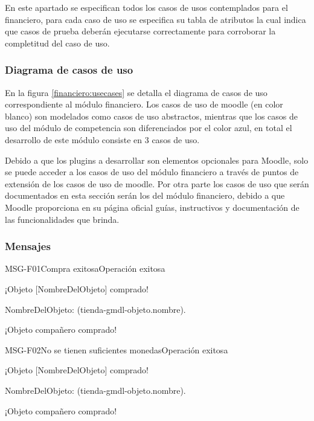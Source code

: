  En este apartado se especifican todos los casos de usos contemplados para el financiero,
 para cada caso de uso se especifica su tabla de atributos la cual indica que casos
 de prueba deberán ejecutarse correctamente para corroborar la completitud del caso de uso.

\subsubsection*{Diagrama de casos de uso}

 En la figura \ref{financiero:usecases} se detalla el diagrama de casos de uso correspondiente al módulo
financiero. Los casos de uso de moodle (en color blanco) son modelados como casos de uso
 abstractos, mientras que los casos de uso del módulo de competencia son diferenciados por el
 color azul, en total el desarrollo de este módulo consiste en 3 casos de uso.


 \noindent
 Debido a que los plugins a desarrollar son elementos opcionales para Moodle, solo se puede
 acceder a los casos de uso del módulo financiero a través de puntos de extensión de los
 casos de uso de moodle. Por otra parte los casos de uso que serán documentados en esta sección
 serán los del módulo financiero, debido a que Moodle proporciona en su página oficial guías,
 instructivos y documentación de las funcionalidades que brinda.




\subsubsection{Mensajes}

    \begin{mensaje2}{MSG-F01}{Compra exitosa}{Operación exitosa}
        \item[Redacción:] ¡Objeto [NombreDelObjeto] comprado!
        \item[Parámetros:]
        \begin{Citemize}
            \item NombreDelObjeto: (tienda-gmdl-objeto.nombre).
        \end{Citemize}
       \item[Ejemplo:] ¡Objeto compañero comprado!
    \end{mensaje2}

    \begin{mensaje2}{MSG-F02}{No se tienen suficientes monedas}{Operación exitosa}
        \item[Redacción:] ¡Objeto [NombreDelObjeto] comprado!
        \item[Parámetros:]
        \begin{Citemize}
            \item NombreDelObjeto: (tienda-gmdl-objeto.nombre).
        \end{Citemize}
       \item[Ejemplo:] ¡Objeto compañero comprado!
    \end{mensaje2}


